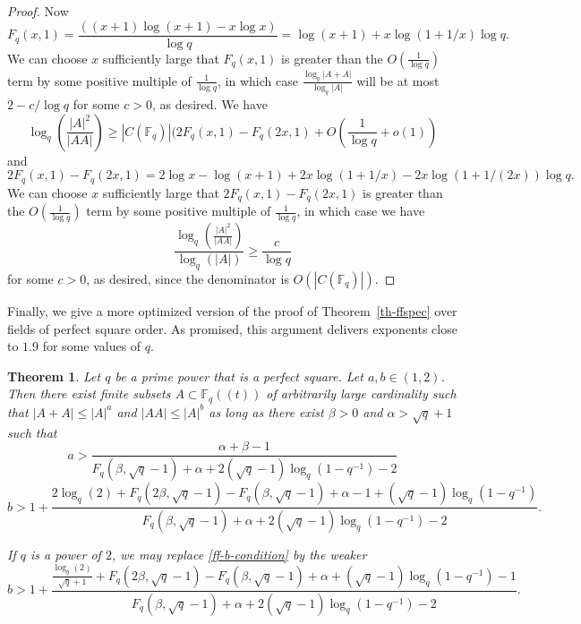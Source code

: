 \documentclass{amsart}
\numberwithin{equation}{section}
\newcommand{\abs}[1]{\mathopen{}\left| #1\mathclose{}\right|}
\newtheorem{theorem}{Theorem}[section]
\begin{document}
\begin{proof}
Now \[F_q(x,1) =\frac{ ( (x+1) \log(x+1)-x\log x)}{\log q} = {\log(x+1) + x \log(1+1/x)} {\log q}.\] We can choose $x$ sufficiently large that $F_q(x,1)$ is greater than the $O(\frac{1}{\log q})$ term by some positive multiple of $\frac{1}{\log q}$, in which case  $ \frac{\log_q \abs{A+A}}{\log_q \abs{A}} $ will be at most $2-c/\log q$ for some $c>0$, as desired. We have
\[ \log_q\left( \frac{ \abs{A}^2}{\abs{AA}} \right) \geq \abs{C(\mathbb F_q)} ( 2F_q(x,1) - F_q(2x,1) +O \left(\frac{1}{\log q}+o(1)\right)\]
and
\[  2F_q(x,1) - F_q(2x,1) ={ 2 \log x -\log(x+1) + 2x \log(1+1/x)- 2x \log(1+1/(2x))}{\log q}.\]
We can choose $x$ sufficiently large that $ 2F_q(x,1) - F_q(2x,1) $ is greater than the $O(\frac{1}{\log q})$ term by some positive multiple of $\frac{1}{\log q}$, in which case we have
\[ \frac{ \log_q( \frac{ \abs{A}^2}{\abs{AA}} )}{\log_q(\abs{A})}  \geq \frac{c}{\log q} \] for some $c>0$, as desired, since the denominator is $O( \abs{C(\mathbb F_q)})$. \end{proof}

Finally, we give a more optimized version of the proof of Theorem~\ref{th-ffspec} over fields of perfect square order. As promised, this argument delivers exponents close to $1.9$ for some values of $q$.
 
 \begin{theorem}\label{ff-complicated} Let $q$ be a prime power that is a perfect square. Let $a,b \in (1,2)$. Then there exist finite subsets $A \subset \mathbb F_{q}((t))$ of arbitrarily large cardinality such that $|A + A| \leq |A|^a$ and $|AA| \leq |A|^b$ as long as there exist $\beta>0$ and $\alpha> \sqrt{q}+1$ such that
 \begin{equation}\label{ff-a-condition} a >\frac{ \alpha + \beta - 1}{ F_q(\beta, \sqrt{q}-1) + \alpha + 2(\sqrt{q}-1) \log_q (1- q^{-1}) -2 } \end{equation}
 \begin{equation}\label{ff-b-condition} b > 1 + \frac{2 \log_q( 2) + F_q(2\beta, \sqrt{q}-1) - F_q(\beta, \sqrt{q}-1) + \alpha -1+ ( \sqrt{q}-1) \log_q(1-q^{-1} )  }{ F_q(\beta, \sqrt{q}-1) + \alpha +  2(\sqrt{q}-1) \log_q (1- q^{-1}) -2 }. \end{equation}
 
 If $q$ is a power of $2$, we may replace \eqref{ff-b-condition} by the weaker 
 \begin{equation}\label{ff-b-condition-char2}  b > 1 + \frac{\frac{ \log_q( 2) }{\sqrt{q}+1} + F_q(2\beta, \sqrt{q}-1) - F_q(\beta, \sqrt{q}-1) + \alpha + ( \sqrt{q}-1) \log_q(1-q^{-1} )  -1}{ F_q(\beta, \sqrt{q}-1) + \alpha +  2(\sqrt{q}-1) \log_q (1- q^{-1}) -2}.\end{equation} \end{theorem}
 
\end{document}
